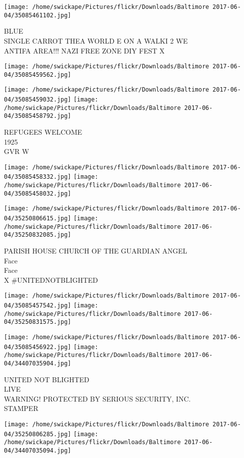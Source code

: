 \documentclass[10pt,letterpaper]{article}
\begin{document}
\texttt{[image: /home/swickape/Pictures/flickr/Downloads/Baltimore 2017-06-04/35085461102.jpg]}

BLUE\\
SINGLE CARROT THEA WORLD E ON A WALKI 2 WE\\
ANTIFA AREA!!! NAZI FREE ZONE DIY FEST X
\pagebreak

\texttt{[image: /home/swickape/Pictures/flickr/Downloads/Baltimore 2017-06-04/35085459562.jpg]}

\vspace{0.25in}
\texttt{[image: /home/swickape/Pictures/flickr/Downloads/Baltimore 2017-06-04/35085459032.jpg]}
\texttt{[image: /home/swickape/Pictures/flickr/Downloads/Baltimore 2017-06-04/35085458792.jpg]}

REFUGEES WELCOME\\
1925\\
GVR W
\pagebreak

\texttt{[image: /home/swickape/Pictures/flickr/Downloads/Baltimore 2017-06-04/35085458332.jpg]}
\texttt{[image: /home/swickape/Pictures/flickr/Downloads/Baltimore 2017-06-04/35085458032.jpg]}

\texttt{[image: /home/swickape/Pictures/flickr/Downloads/Baltimore 2017-06-04/35250806615.jpg]}
\texttt{[image: /home/swickape/Pictures/flickr/Downloads/Baltimore 2017-06-04/35250832085.jpg]}

PARISH HOUSE CHURCH OF THE GUARDIAN ANGEL\\
Face\\
Face\\
X \#UNITEDNOTBLIGHTED
\pagebreak

\texttt{[image: /home/swickape/Pictures/flickr/Downloads/Baltimore 2017-06-04/35085457542.jpg]}
\texttt{[image: /home/swickape/Pictures/flickr/Downloads/Baltimore 2017-06-04/35250831575.jpg]}

\texttt{[image: /home/swickape/Pictures/flickr/Downloads/Baltimore 2017-06-04/35085456922.jpg]}
\texttt{[image: /home/swickape/Pictures/flickr/Downloads/Baltimore 2017-06-04/34407035904.jpg]}

UNITED NOT BLIGHTED\\
LIVE\\
WARNING!  PROTECTED BY SERIOUS SECURITY, INC.\\
STAMPER
\pagebreak

\texttt{[image: /home/swickape/Pictures/flickr/Downloads/Baltimore 2017-06-04/35250806285.jpg]}
\texttt{[image: /home/swickape/Pictures/flickr/Downloads/Baltimore 2017-06-04/34407035094.jpg]}
\end{document}
